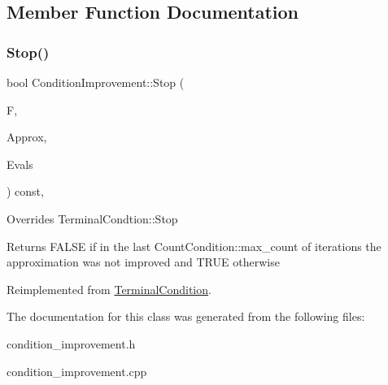 \subsection{Member Function Documentation}
\mbox{\label{class_condition_improvement_a012d8db22fd6fcf8a71ab0fb5ecc1940}} 
\subsubsection{\texorpdfstring{Stop()}{Stop()}}
{\footnotesize\ttfamily bool Condition\+Improvement\+::\+Stop (\begin{DoxyParamCaption}\item[{std\+::shared\+\_\+ptr$<$ \hyperlink{class_function}{Function} $>$}]{F,  }\item[{const std\+::vector$<$ \hyperlink{classv_point}{v\+Point} $>$ \&}]{Approx,  }\item[{const std\+::vector$<$ double $>$ \&}]{Evals }\end{DoxyParamCaption}) const\hspace{0.3cm}{\ttfamily [override]}, {\ttfamily [virtual]}}

Overrides Terminal\+Condtion\+::\+Stop \begin{DoxyReturn}{Returns}
F\+A\+L\+SE if in the last Count\+Condition\+::max\+\_\+count of iterations the approximation was not improved and T\+R\+UE otherwise 
\end{DoxyReturn}


Reimplemented from \hyperlink{class_terminal_condition_ad6294bf2bd6f5e2c6164e461c24d3198}{Terminal\+Condition}.



The documentation for this class was generated from the following files\+:\begin{DoxyCompactItemize}
\item 
condition\+\_\+improvement.\+h\item 
condition\+\_\+improvement.\+cpp\end{DoxyCompactItemize}
